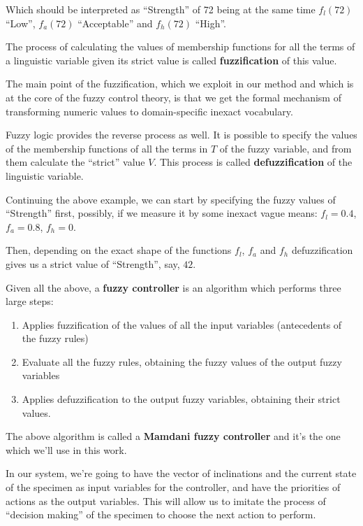 \documentclass[12pt, a4paper]{report}
\begin{document}
  Which should be interpreted as ``Strength'' of 72 being at the same time $f_l(72)$ ``Low'', $f_a(72)$ ``Acceptable'' and $f_h(72)$ ``High''.

  The process of calculating the values of membership functions for all the terms of a linguistic variable given its strict value is called \textbf{fuzzification} of this value.

  The main point of the fuzzification, which we exploit in our method and which is at the core of the fuzzy control theory, is that we get the formal mechanism of transforming numeric values to domain-specific inexact vocabulary.

  Fuzzy logic provides the reverse process as well.
  It is possible to specify the values of the membership functions of all the terms in $T$ of the fuzzy variable, and from them calculate the ``strict'' value $V$.
  This process is called \textbf{defuzzification} of the linguistic variable.

  Continuing the above example, we can start by specifying the fuzzy values of ``Strength'' first, possibly, if we measure it by some inexact vague means:
  $f_l = 0.4$, $f_a = 0.8$, $f_h = 0$.

  Then, depending on the exact shape of the functions $f_l$, $f_a$ and $f_h$ defuzzification gives us a strict value of ``Strength'', say, $42$.

  Given all the above, a \textbf{fuzzy controller} is an algorithm which performs three large steps:

  \begin{enumerate}
    \item Applies fuzzification of the values of all the input variables (antecedents of the fuzzy rules)
    \item Evaluate all the fuzzy rules, obtaining the fuzzy values of the output fuzzy variables
    \item Applies defuzzification to the output fuzzy variables, obtaining their strict values.
  \end{enumerate}

  The above algorithm is called a \textbf{Mamdani fuzzy controller} and it's the one which we'll use in this work.

  In our system, we're going to have the vector of inclinations and the current state of the specimen as input variables for the controller,
  and have the priorities of actions as the output variables.
  This will allow us to imitate the process of ``decision making'' of the specimen to choose the next action to perform.
\end{document}
